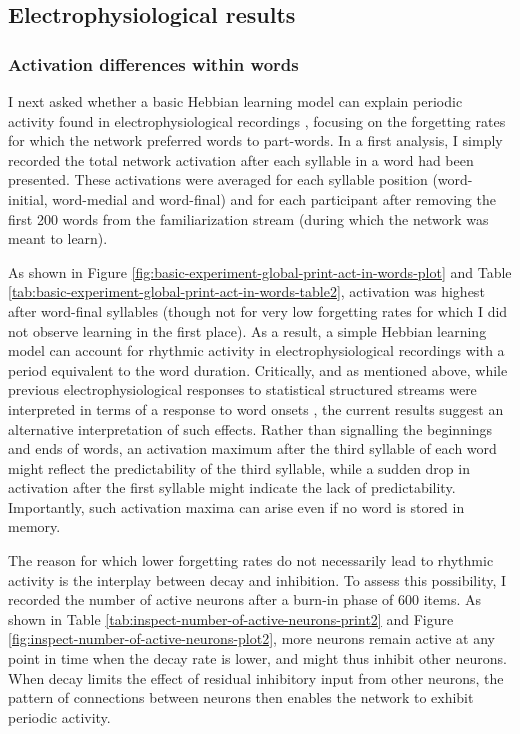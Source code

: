 \documentclass[
]{article}
\begin{document}
\clearpage

\hypertarget{electrophysiological-results}{%
\subsection{Electrophysiological
results}\label{electrophysiological-results}}

\hypertarget{activation-differences-within-words}{%
\subsubsection{Activation differences within
words}\label{activation-differences-within-words}}

I next asked whether a basic Hebbian learning model can explain periodic
activity found in electrophysiological recordings
\citep{Buiatti2009, Batterink2017, Flo2022, Kabdebon2015, Moreau2022, Moser2021},
focusing on the forgetting rates for which the network preferred words
to part-words. In a first analysis, I simply recorded the total network
activation after each syllable in a word had been presented. These
activations were averaged for each syllable position (word-initial,
word-medial and word-final) and for each participant after removing the
first 200 words from the familiarization stream (during which the
network was meant to learn).

As shown in Figure
\ref{fig:basic-experiment-global-print-act-in-words-plot} and Table
\ref{tab:basic-experiment-global-print-act-in-words-table2}, activation
was highest after word-final syllables (though not for very low
forgetting rates for which I did not observe learning in the first
place). As a result, a simple Hebbian learning model can account for
rhythmic activity in electrophysiological recordings with a period
equivalent to the word duration. Critically, and as mentioned above,
while previous electrophysiological responses to statistical structured
streams were interpreted in terms of a response to word onsets
\citep{Abla2008, Cunillera2006, Kudo2011, Sanders2002, Teinonen2009},
the current results suggest an alternative interpretation of such
effects. Rather than signalling the beginnings and ends of words, an
activation maximum after the third syllable of each word might reflect
the predictability of the third syllable, while a sudden drop in
activation after the first syllable might indicate the lack of
predictability. Importantly, such activation maxima can arise even if no
word is stored in memory.

The reason for which lower forgetting rates do not necessarily lead to
rhythmic activity is the interplay between decay and inhibition. To
assess this possibility, I recorded the number of active neurons after a
burn-in phase of 600 items. As shown in Table
\ref{tab:inspect-number-of-active-neurons-print2} and Figure
\ref{fig:inspect-number-of-active-neurons-plot2}, more neurons remain
active at any point in time when the decay rate is lower, and might thus
inhibit other neurons. When decay limits the effect of residual
inhibitory input from other neurons, the pattern of connections between
neurons then enables the network to exhibit periodic activity.
\end{document}
